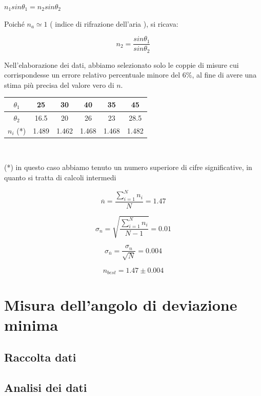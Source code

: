 \documentclass[a4paper,10pt]{report}
\begin{document}
\begin{center}
$n_1 sin\theta_1 = n_2 sin\theta_2$
\end{center}

Poiché $n_a \simeq1 $ ( indice di rifrazione dell'aria ), si ricava:

$$n_2 = \frac{sin\theta_1}{sin\theta_2}$$

Nell'elaborazione dei dati, abbiamo selezionato solo le coppie di misure cui corrispondesse un errore relativo percentuale minore del 6\%, al fine di avere una stima più precisa del valore vero di $n$.\\
\begin{center}


\begin{tabular}{c|c|c|c|c|c}
\textbf{$\theta_1$} & 25 & 30 & 40 & 35 & 45\\
\midrule
\textbf{$\theta_2$} & 16.5 & 20 & 26 & 23 & 28.5\\
\midrule
\textbf{$n_i$} (*) & 1.489 & 1.462 & 1.468 & 1.468 & 1.482\\
\end{tabular}\\

\end{center}
(*) in questo caso abbiamo tenuto un numero superiore di cifre significative, in quanto si tratta di calcoli intermedi

$$\overline{n} = \frac{\displaystyle\sum\limits_{i=1}^N n_i}{N} = 1.47$$

$$\sigma_n = \sqrt{\frac{\displaystyle\sum\limits_{i=1}^N n_i}{N-1}} = 0.01$$

$$\sigma_{\overline{n}} = \frac{\sigma_n}{\sqrt{N}} = 0.004$$

$$n_{best} = 1.47 \pm 0.004 $$

\section{Misura dell'angolo di deviazione minima}
\subsection{Raccolta dati}
\subsection{Analisi dei dati}
\end{document}
